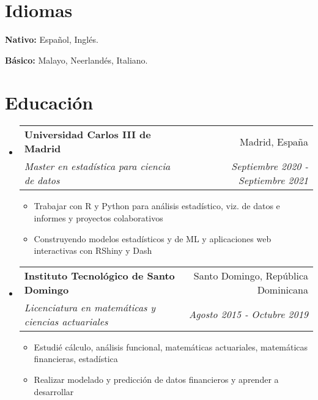 \documentclass[a4paper,20pt]{article}
\makeatletter
\newcommand{\resumeSubheading}[4]{
  \vspace{-1pt}\item
    \begin{tabular*}{0.97\textwidth}{l@{\extracolsep{\fill}}r}
      \textbf{#1} & #2 \\
      \textit{#3} & \textit{#4} \\
    \end{tabular*}\vspace{-5pt}
}
\newcommand{\resumeSubHeadingListStart}{\begin{itemize}[leftmargin=*]}
\newcommand{\resumeSubHeadingListEnd}{\end{itemize}}
\makeatother
\begin{document}
            
\vspace{-15pt}
\section{Idiomas}
  \begin{center}
  \begin{itemize*}
        
  \item \textbf{Nativo:} Español, Inglés.
  \item \textbf{Básico:} Malayo, Neerlandés, Italiano.
\end{itemize*}
\end{center}


            
\vspace{-15pt}
\section{Educación}
\resumeSubHeadingListStart
        
  \resumeSubheading
    {Universidad Carlos III de Madrid}{Madrid, España}
    {Master en estadística para ciencia de datos}{Septiembre 2020 - Septiembre 2021}
\begin{itemize} \itemsep-0.24em
  \item Trabajar con R y Python para análisis estadístico, viz. de datos e informes y proyectos colaborativos
  \item Construyendo modelos estadísticos y de ML y aplicaciones web interactivas con RShiny y Dash
\end{itemize}
\vspace{-2pt}
  \resumeSubheading
    {Instituto Tecnológico de Santo Domingo}{Santo Domingo, República Dominicana}
    {Licenciatura en matemáticas y ciencias actuariales}{Agosto 2015 - Octubre 2019}
\begin{itemize} \itemsep-0.24em
  \item Estudié cálculo, análisis funcional, matemáticas actuariales, matemáticas financieras, estadística
  \item Realizar modelado y predicción de datos financieros y aprender a desarrollar
\end{itemize}
\resumeSubHeadingListEnd


            
\vspace{-12pt}
\end{document}
